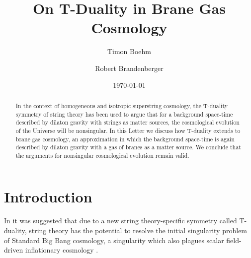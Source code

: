 \documentclass[a4paper,twocolumn,nofootinbib,tightenlines,prd,aps,
               superscriptaddress]{revtex4} %
\begin{document}


\title{On T-Duality in  Brane Gas Cosmology}

\author{Timon Boehm }




\author{Robert Brandenberger}



\date{\today}



\begin{abstract}
In the context of homogeneous and isotropic
superstring cosmology, the T-duality symmetry
of string theory has been used to argue that
for a background space-time described by dilaton gravity with
strings as matter sources, the cosmological evolution of the
Universe will be nonsingular. In this Letter we discuss how
T-duality extends to brane gas cosmology, an approximation in
which the background space-time is again described by dilaton
gravity with a gas of branes as a matter source. We conclude that
the arguments for nonsingular cosmological evolution remain valid.
\end{abstract}

\maketitle %


\section{Introduction}

In \cite{Brandenberger:1989aj} it was suggested that due to a new
string theory-specific symmetry called T-duality, string theory
has the potential to resolve the initial singularity problem of
Standard Big Bang cosmology, a singularity which also plagues
scalar field-driven inflationary cosmology
\cite{Borde:1994xh,Borde:2001nh}.
\end{document}
